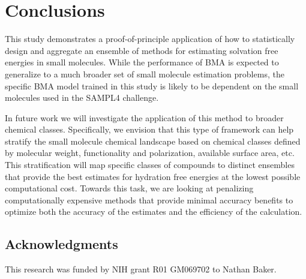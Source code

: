 \documentclass[journal=jpcbfk, manuscript=article]{achemso}
\newcommand{\+}[1]{\ensuremath{\mathbf{#1}}}
\begin{document}
\section{Conclusions}
This study demonstrates a proof-of-principle application of how to statistically design and aggregate an ensemble of methods for estimating solvation free energies in small molecules.
While the performance of BMA is expected to generalize to a much broader set of small molecule estimation problems, the specific BMA model trained in this study is likely to be dependent on the small molecules used in the SAMPL4 challenge.

In future work we will investigate the application of this method to broader chemical classes.
Specifically, we envision that this type of framework can help stratify the small molecule chemical landscape based on chemical classes defined by molecular weight, functionality and polarization, available surface area, etc.
This stratification will map specific classes of compounds to distinct ensembles that provide the best estimates for hydration free energies at the lowest possible computational cost.
Towards this task, we are looking at penalizing computationally expensive methods that provide minimal accuracy benefits to optimize both the accuracy of the estimates and the efficiency of the calculation.

\subsection*{Acknowledgments}
This research was funded by NIH grant R01 GM069702 to Nathan Baker.


\end{document}
